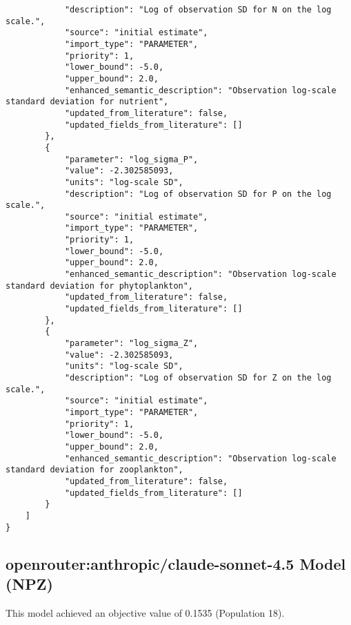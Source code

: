 \begin{lstlisting}
            "description": "Log of observation SD for N on the log scale.",
            "source": "initial estimate",
            "import_type": "PARAMETER",
            "priority": 1,
            "lower_bound": -5.0,
            "upper_bound": 2.0,
            "enhanced_semantic_description": "Observation log-scale standard deviation for nutrient",
            "updated_from_literature": false,
            "updated_fields_from_literature": []
        },
        {
            "parameter": "log_sigma_P",
            "value": -2.302585093,
            "units": "log-scale SD",
            "description": "Log of observation SD for P on the log scale.",
            "source": "initial estimate",
            "import_type": "PARAMETER",
            "priority": 1,
            "lower_bound": -5.0,
            "upper_bound": 2.0,
            "enhanced_semantic_description": "Observation log-scale standard deviation for phytoplankton",
            "updated_from_literature": false,
            "updated_fields_from_literature": []
        },
        {
            "parameter": "log_sigma_Z",
            "value": -2.302585093,
            "units": "log-scale SD",
            "description": "Log of observation SD for Z on the log scale.",
            "source": "initial estimate",
            "import_type": "PARAMETER",
            "priority": 1,
            "lower_bound": -5.0,
            "upper_bound": 2.0,
            "enhanced_semantic_description": "Observation log-scale standard deviation for zooplankton",
            "updated_from_literature": false,
            "updated_fields_from_literature": []
        }
    ]
}
\end{lstlisting}
\clearpage
\subsection{openrouter:anthropic/claude-sonnet-4.5 Model (NPZ)}
This model achieved an objective value of 0.1535 (Population 18).

